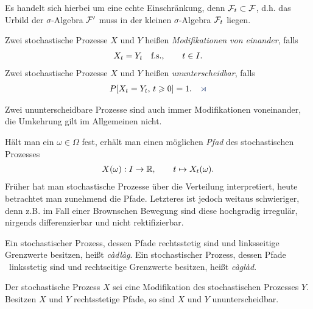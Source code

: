 Es handelt sich hierbei um eine echte Einschränkung, denn $\mathcal{F}_t \subset\mathcal{F}$,
d.h. das Urbild der $\sigma$-Algebra $\mathcal{F}'$ muss in der kleinen $\sigma$-Algebra
$\mathcal{F}_t$ liegen. 

\begin{defn}
\label{defn:1.5}
Zwei stochastische Prozesse $X$ und $Y$ heißen \emph{Modifikationen von
einander}, falls 
\begin{align*}
X_t = Y_t\quad \text{f.s.},\qquad t\in I.
\end{align*}
Zwei stochastische Prozesse $X$ und $Y$ heißen \emph{ununterscheidbar}, falls
\begin{align*}
P[X_t =Y_t,\, t\ge 0] = 1.\fish
\end{align*}
\end{defn}

Zwei ununterscheidbare Prozesse sind auch immer Modifikationen voneinander, die
Umkehrung gilt im Allgemeinen nicht.

Hält man ein $\omega\in\Omega$ fest, erhält man einen möglichen \emph{Pfad} des
stochastischen Prozesses
\begin{align*}
X(\omega) : I\to \mathbb{R},\qquad t\mapsto X_t(\omega). 
\end{align*}
Früher hat man stochastische Prozesse über die Verteilung interpretiert, heute
betrachtet man zunehmend die Pfade. Letzteres ist jedoch weitaus schwieriger,
denn z.B. im Fall einer Brownschen Bewegung sind diese hochgradig irregulär,
nirgends differenzierbar und nicht rektifizierbar.

\begin{defn}
\label{defn:1.6}
Ein stochastischer Prozess, dessen Pfade \fs rechtsstetig sind und linksseitige
Grenzwerte besitzen, heißt \emph{càdlàg}. Ein stochastischer Prozess, dessen
Pfade \fs\ linksstetig sind und rechtseitige Grenzwerte besitzen, heißt
\emph{càglàd}.\fish
\end{defn}

\begin{prop}
\label{prop:1.2}
Der stochastische Prozess $X$ sei eine Modifikation des stochastischen Prozesses
$Y$. Besitzen $X$ und $Y$ \fs rechtsstetige Pfade, so sind $X$ und $Y$
ununterscheidbar.\fish
\end{prop}

